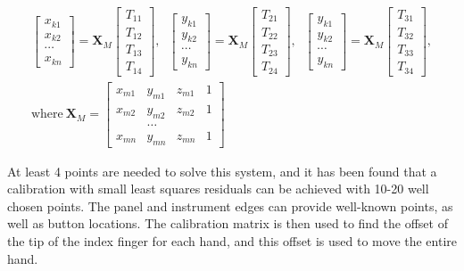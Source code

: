 \begin{gather*}
    \begin{bmatrix}
        x_{k1} \\
        x_{k2} \\
        \cdots \\
        x_{kn}
    \end{bmatrix}
    =
    \mathbf{X}_M
    \begin{bmatrix}
        T_{11} \\
        T_{12} \\
        T_{13} \\
        T_{14}
    \end{bmatrix}
    ,\;\;
    \begin{bmatrix}
        y_{k1} \\
        y_{k2} \\
        \cdots \\
        y_{kn}
    \end{bmatrix}
    =
    \mathbf{X}_M
    \begin{bmatrix}
        T_{21} \\
        T_{22} \\
        T_{23} \\
        T_{24}
    \end{bmatrix}
    ,\;\;
    \begin{bmatrix}
        y_{k1} \\
        y_{k2} \\
        \cdots \\
        y_{kn}
    \end{bmatrix}
    =
    \mathbf{X}_M
    \begin{bmatrix}
        T_{31} \\
        T_{32} \\
        T_{33} \\
        T_{34}
    \end{bmatrix}
    ,\\
    \text{where}~\mathbf{X}_M =
    \begin{bmatrix}
        x_{m1} & y_{m1} & z_{m1} & 1 \\
        x_{m2} & y_{m2} & z_{m2} & 1 \\
        &\dots & & \\
        x_{mn} & y_{mn} & z_{mn} & 1
    \end{bmatrix}
\end{gather*}

At least 4 points are needed to solve this system, and it has been found that a calibration with small least squares residuals can be achieved with 10-20 well chosen points.
The panel and instrument edges can provide well-known points, as well as button locations.
The calibration matrix is then used to find the offset of the tip of the index finger for  each hand, and this offset is used to move the entire hand.

